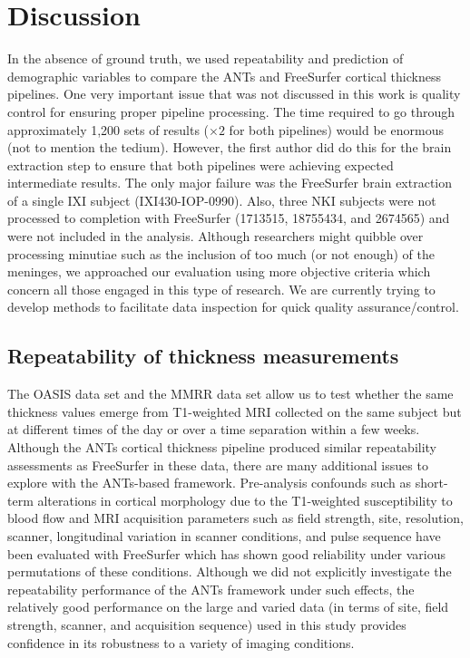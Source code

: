 \section{Discussion}
In the absence of ground truth, we used repeatability and prediction of
demographic variables to compare the ANTs and FreeSurfer cortical 
thickness pipelines.  One very important
issue that was not discussed in this work is quality control for
ensuring proper pipeline processing.  The time required to go through 
approximately 1,200 sets of results ($\times 2$ for both pipelines) would be
enormous (not to mention the tedium).  However, the first
author did do this for the brain extraction step to ensure that both pipelines
were achieving expected intermediate results.  The only
major failure was the FreeSurfer brain extraction of
a single IXI subject (IXI430-IOP-0990).
Also, three NKI subjects were not processed to completion
with FreeSurfer (1713515, 18755434, and 2674565) and were not included in the analysis.
Although  researchers might quibble over processing minutiae such as the
inclusion of too much (or not enough) of the meninges, we approached
our evaluation using more objective criteria which concern all those
engaged in this type of research.  We are currently trying to develop methods
to facilitate data inspection for quick quality assurance/control.


\subsection{Repeatability of thickness measurements}
The OASIS data set and the MMRR data set allow us to test 
whether the same thickness values emerge from T1-weighted
MRI collected on the same subject but at different times of
the day or over a time separation within a few weeks.  
Although the ANTs cortical thickness pipeline produced similar
repeatability assessments as FreeSurfer in these data, there
are many additional issues to explore with the ANTs-based
framework.  Pre-analysis confounds such as short-term alterations in cortical 
morphology due to the T1-weighted susceptibility to blood flow 
\cite{Franklin2013,Salgado-Pineda2006,Yamasue2007} and
MRI acquisition parameters such as field strength, site, resolution, 
scanner, longitudinal variation in scanner conditions, and pulse sequence \citep{han2006,lusebrink2013,jovicich2013} have been evaluated
with FreeSurfer which has shown good reliability
under various permutations of these conditions.  
Although we did not explicitly investigate the repeatability performance of the 
ANTs framework under such effects, the relatively good performance
on the large and varied data (in terms of site, field strength, scanner,
and acquisition sequence) used in this study provides confidence in 
its robustness to a variety of imaging conditions.

